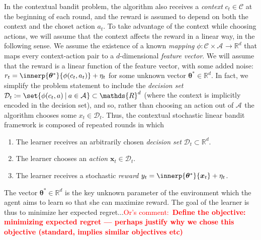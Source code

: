 \documentclass{article}
\newcommand{\os}[1]{\textcolor{red}{Or's comment:~\textbf{#1}}}
\renewcommand{\vec}[1]{\bm{#1}}
\newcommand{\defeq}{\coloneq}
\newcommand{\Real}{\mathds{R}}
\newcommand\given[1][\delimsize]{%
  \providecommand{\delimsize}{}
  \nonscript\:#1\vert\allowbreak\nonscript\:\mathopen{}
}
\newcommand{\C}{\mathcal{C}}
\newcommand{\Aset}[1]{\mathcal{A}_{#1}}
\newcommand{\Dset}[1]{\mathcal{D}_{#1}}
\newcommand{\Cset}[1]{\mathcal{C}_{#1}}
\begin{document}
In the contextual bandit problem, the algorithm also receives a
\emph{context} $c_t\in\C$ at the beginning of each round, and the
reward is assumed to depend on both the context and the choset action $a_t$.  To
take advantage of the context while choosing actions, we will assume
that the context affects the reward in a linear way, in the following
sense.  We assume the existence of a known \emph{mapping}
$\phi:\Cset{}\times\Aset{}\to\Real^d$ that maps every context-action
pair to a $d$-dimensional \emph{feature vector}.  We will assume that
the reward is a linear function of the feature vector, with some added
noise: $r_t = \innerp{\vec\theta^*}{\phi(c_t,a_t)} + \eta_t$ for some
unknown vector $\vec\theta^*\in\Real^d$. In fact, we simplify the
problem statement to include the \emph{decision set}
$\Dset{t} \defeq \set{\phi(c_t,a)\given a\in\Aset{}} \subset \Real^d$
(where the context is implicitly encoded in the decision set), and so,
rather than choosing an action out of $\Aset{}$ the algorithm chooses
some $x_t\in\Dset{t}$.  Thus, the contextual stochastic linear bandit
framework is composed of repeated rounds in which
\begin{enumerate}
\item The learner receives an arbitrarily chosen \emph{decision set} $\mathcal{D}_t \subset
  \Real^d$.
\item The learner chooses an \emph{action} $\vec x_t \in \mathcal{D}_t$.
\item The learner receives a stochastic \emph{reward}
  $y_t = \innerp{\vec\theta^*}{\vec x_t} + \eta_t$.
\end{enumerate}
The vector $\vec\theta^*\in\Real^d$ is the key unknown parameter of the
environment which the agent aims to learn so that she can maximize reward. The goal of the learner is thus to minimize her expected regret...\os{Define the objective: minimizing expected regret --- perhaps justify why we chose this objective (standard, implies similar objectives etc)}
\end{document}
